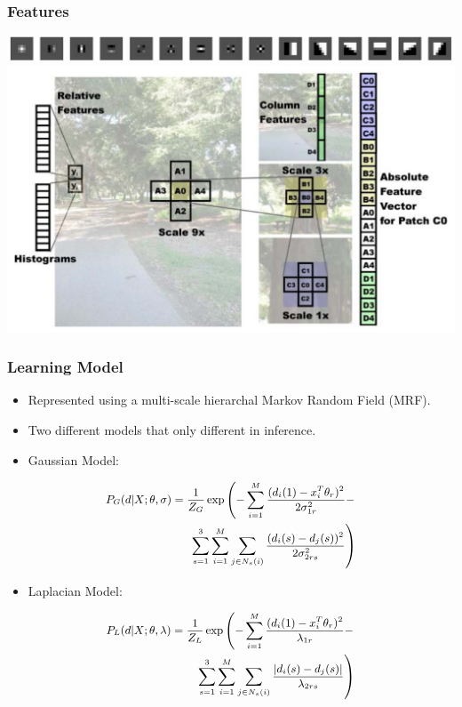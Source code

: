 \documentclass[handout]{beamer}
\newcommand{\vitem}{\vfill\item}
\begin{document}
\begin{frame}[t]\frametitle{Features}
    \includegraphics[width=\linewidth]{lawsmask.PNG}
    \vfill\includegraphics[width=\linewidth]{Features.PNG}
\end{frame}

\begin{frame}[t]\frametitle{Learning Model}
    \begin{itemize}
        \vitem Represented using a multi-scale hierarchal Markov Random Field (MRF).
        \vitem Two different models that only different in inference.
        \vitem Gaussian Model:
    \end{itemize}
    \begin{equation}
    \small
    \begin{split}
    \nonumber
    P_G(d|X; \theta, \sigma) = \frac{1}{Z_G}\exp\left(-\sum_{i=1}^{M}\frac{(d_i(1)-x_i^T\theta_r)^2}{2\sigma^2_{1r}} - \right.\\
    \left.\sum_{s=1}^3\sum_{i=1}^M\sum_{j \in N_s(i)} \frac{(d_i(s)-d_j(s))^2}{2\sigma_{2rs}^2}\right)
    \end{split}
    \end{equation}
    \begin{itemize}
        \vitem Laplacian Model:
    \end{itemize}
    \begin{equation}
    \small
    \begin{split}
    \nonumber
    P_L(d|X; \theta, \lambda) = \frac{1}{Z_L}\exp\left(-\sum_{i=1}^{M}\frac{(d_i(1)-x_i^T\theta_r)^2}{\lambda_{1r}} - \right.\\
    \left.\sum_{s=1}^3\sum_{i=1}^M\sum_{j \in N_s(i)} \frac{|d_i(s)-d_j(s)|}{\lambda_{2rs}}\right)
    \end{split}
    \end{equation}
\end{frame}
\end{document}
